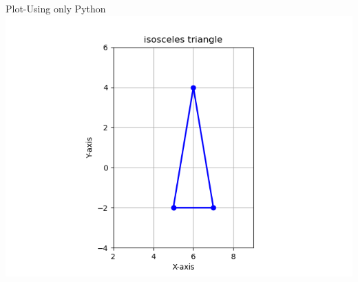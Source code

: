 \documentclass{beamer}
\begin{document}
\begin{frame}{Plot-Using only Python}
    \centering
    \includegraphics[width=\columnwidth, height=0.8\textheight, keepaspectratio]{figs/triangle2.png}     
\end{frame}
\end{document}
